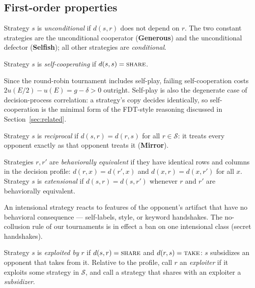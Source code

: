 \subsection{First-order properties}

\begin{definition}[Unconditionality]
Strategy $s$ is \emph{unconditional} if $d(s, r)$ does not depend on
$r$.  The two constant strategies are the unconditional cooperator
(\textbf{Generous}) and the unconditional defector (\textbf{Selfish});
all other strategies are \emph{conditional}.
\end{definition}

\begin{definition}
Strategy $s$ is \emph{self-cooperating} if
$d(s, s) = \textup{\textsc{share}}$.
\end{definition}

Since the round-robin tournament includes self-play, failing
self-cooperation costs $2u(E/2) - u(E) = g - \delta > 0$ outright.
Self-play is also the degenerate case of decision-process
correlation: a strategy's copy decides identically, so
self-cooperation is the minimal form of the FDT-style reasoning
discussed in Section~\ref{sec:related}.

\begin{definition}[Reciprocity]
Strategy $s$ is \emph{reciprocal} if $d(s, r) = d(r, s)$ for all
$r \in \mathcal{S}$: it treats every opponent exactly as that
opponent treats it (\textbf{Mirror}).
\end{definition}

\begin{definition}
Strategies $r, r'$ are \emph{behaviorally equivalent} if they have
identical rows and columns in the decision profile:
$d(r, x) = d(r', x)$ and $d(x, r) = d(x, r')$ for all $x$.
Strategy $s$ is \emph{extensional} if $d(s, r) = d(s, r')$ whenever
$r$ and $r'$ are behaviorally equivalent.
\end{definition}

An intensional strategy reacts to features of the opponent's artifact
that have no behavioral consequence --- self-labels, style, or
keyword handshakes.
The no-collusion rule of our tournaments is in effect a ban on one
intensional class (secret handshakes).

\begin{definition}[Exploitability]
Strategy $s$ is \emph{exploited by} $r$ if
$d(s, r) = \textup{\textsc{share}}$ and
$d(r, s) = \textup{\textsc{take}}$: $s$ subsidizes an opponent that
takes from it.
Relative to the profile, call $r$ an \emph{exploiter} if it exploits
some strategy in $\mathcal{S}$, and call a strategy that shares with
an exploiter a \emph{subsidizer}.
\end{definition}

